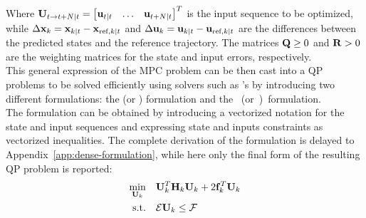 \documentclass[../main.tex]{subfiles}
\begin{document}
Where $\mathbf{U}_{t \to t+N | t} = \begin{bmatrix} \mathbf{u}_{t | t} & \ldots &
\mathbf{u}_{t+N | t} \end{bmatrix}^T$ is the input sequence to be optimized, while
$\Delta \mathbf{x}_k = \mathbf{x}_{k | t} - \mathbf{x}_{\text{ref},k | t}$ and $\Delta \mathbf{u}_k =
\mathbf{u}_{k | t} - \mathbf{u}_{\text{ref},k | t}$ are the differences between the predicted
states and the reference trajectory. 
The matrices $\mathbf{Q} \geq 0$ and $\mathbf{R} > 0$ are
the weighting matrices for the state and input errors, respectively.\\
This general expression of the MPC problem can be then cast into a QP
problems to be solved efficiently using solvers such as 's
 by introducing two different formulations: the  (or
) formulation and the \mbox{ (or
)~formulation}.\\
The  formulation can be obtained by introducing a vectorized notation
for the state and input sequences and expressing state and inputs constraints as vectorized inequalities. The complete derivation of the
 formulation is delayed to Appendix~\ref{app:dense-formulation},
while here only the final form of the resulting QP problem is reported:
\begin{equation}\label{eq:dense-formulation}
	\begin{aligned}
		\min_{\mathbf{U}_k} \quad & \mathbf{U}_k^T \mathbf{H}_k \mathbf{U}_k + 2 \mathbf{f}_k^T
		\mathbf{U}_k\\
		\text{s.t.} \quad & \mathcal{E} \mathbf{U}_k \leq \mathcal{F}
	\end{aligned}
\end{equation}
\end{document}
